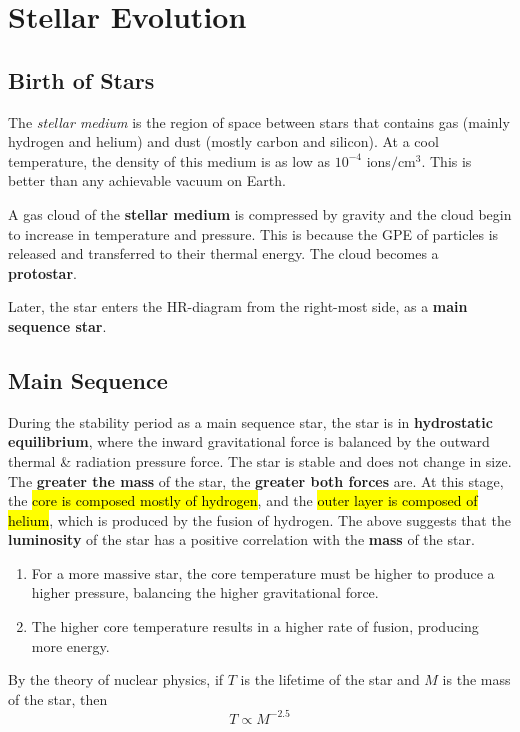 \documentclass[a4paper,12pt]{article}
\let\oldsection\section
\renewcommand\section{\clearpage\oldsection}
\begin{document}
\section{Stellar Evolution}

\subsection{Birth of Stars}

The \textit{stellar medium} is the region of space between stars that contains gas (mainly hydrogen and helium) and dust (mostly carbon and silicon). At a cool temperature, the density of this medium is as low as $10^{-4}$ ions$/$cm$^3$. This is better than any achievable vacuum on Earth.

A gas cloud of the \textbf{stellar medium} is compressed by gravity and the cloud begin to increase in temperature and pressure. This is because the GPE of particles is released and transferred to their thermal energy. The cloud becomes a \textbf{protostar}.

Later, the star enters the HR-diagram from the right-most side, as a \textbf{main sequence star}.

\subsection{Main Sequence}

During the stability period as a main sequence star, the star is in \textbf{hydrostatic equilibrium}, where the inward gravitational force is balanced by the outward thermal \& radiation pressure force. The star is stable and does not change in size. The \textbf{greater the mass} of the star, the \textbf{greater both forces} are. At this stage, the \hl{core is composed mostly of hydrogen}, and the \hl{outer layer is composed of helium}, which is produced by the fusion of hydrogen.
The above suggests that the \textbf{luminosity} of the star has a positive correlation with the \textbf{mass} of the star.
\begin{enumerate}
  \item For a more massive star, the core temperature must be higher to produce a higher pressure, balancing the higher gravitational force.
  \item The higher core temperature results in a higher rate of fusion, producing more energy.
\end{enumerate}

\pagebreak

By the theory of nuclear physics, if $T$ is the lifetime of the star and $M$ is the mass of the star, then
$$T\propto M^{-2.5}$$
\end{document}
